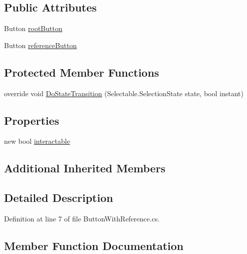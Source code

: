 \subsection*{Public Attributes}
\begin{DoxyCompactItemize}
\item 
Button \hyperlink{class_unity_engine_1_1_u_i_1_1_button_with_reference_a708bfbc4f19404b7625e57dc1e62d164}{root\+Button}
\item 
Button \hyperlink{class_unity_engine_1_1_u_i_1_1_button_with_reference_a664f9c25ccb478b7c267ec2ad40e650b}{reference\+Button}
\end{DoxyCompactItemize}
\subsection*{Protected Member Functions}
\begin{DoxyCompactItemize}
\item 
override void \hyperlink{class_unity_engine_1_1_u_i_1_1_button_with_reference_a15a6a1386a2d60062abcb12edf785553}{Do\+State\+Transition} (Selectable.\+Selection\+State state, bool instant)
\end{DoxyCompactItemize}
\subsection*{Properties}
\begin{DoxyCompactItemize}
\item 
new bool \hyperlink{class_unity_engine_1_1_u_i_1_1_button_with_reference_a8d984d0e69caeffeffe56eb463961350}{interactable}
\end{DoxyCompactItemize}
\subsection*{Additional Inherited Members}


\subsection{Detailed Description}


Definition at line 7 of file Button\+With\+Reference.\+cs.



\subsection{Member Function Documentation}
\hypertarget{class_unity_engine_1_1_u_i_1_1_button_with_reference_a15a6a1386a2d60062abcb12edf785553}{}
